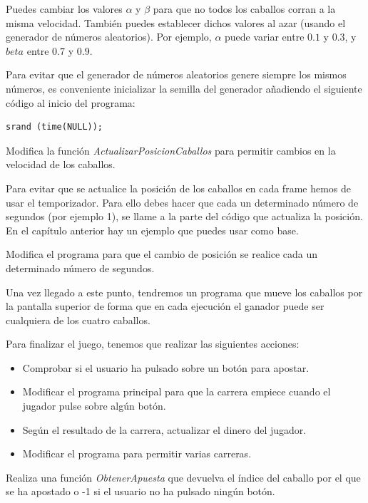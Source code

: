 Puedes cambiar los valores $\alpha$ y $\beta$ para que no todos los caballos corran a la misma velocidad. También puedes establecer dichos valores al azar (usando el generador de números aleatorios). Por ejemplo, $\alpha$ puede variar entre $0.1$ y $0.3$, y $beta$ entre $0.7$ y $0.9$.

Para evitar que el generador de números aleatorios genere siempre los mismos números, es conveniente inicializar la semilla del generador añadiendo el siguiente código al inicio del programa:

\begin{lstlisting}
srand (time(NULL));
\end{lstlisting}
	
\begin{exercise}
	 Modifica la función \textit{ActualizarPosicionCaballos} para permitir cambios en la velocidad de los caballos.
\end{exercise}

Para evitar que se actualice la posición de los caballos en cada frame hemos de usar el temporizador. Para ello debes hacer que cada un determinado número de segundos (por ejemplo 1), se llame a la parte del código que actualiza la posición. En el capítulo anterior hay un ejemplo que puedes usar como base.

\begin{exercise}
	Modifica el programa para que el cambio de posición se realice cada un determinado número de segundos.
\end{exercise}

Una vez llegado a este punto, tendremos un programa que mueve los caballos por la pantalla superior de forma que en cada ejecución el ganador puede ser cualquiera de los cuatro caballos.

Para finalizar el juego, tenemos que realizar las siguientes acciones:

\begin{itemize}
\item Comprobar si el usuario ha pulsado sobre un botón para apostar. 
\item Modificar el programa principal para que la carrera empiece cuando el jugador pulse sobre algún botón.
\item Según el resultado de la carrera, actualizar el dinero del jugador.
\item Modificar el programa para permitir varias carreras.
\end{itemize}

\begin{exercise}
	Realiza una función \textit{ObtenerApuesta} que devuelva el índice del caballo por el que se ha apostado o -1 si el usuario no ha pulsado ningún botón. 
\end{exercise}

